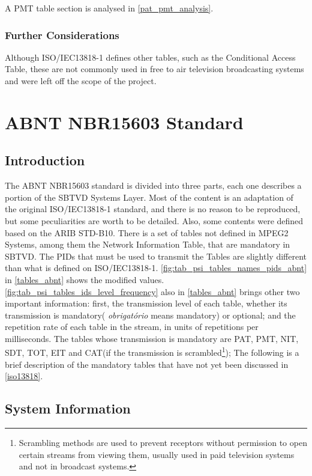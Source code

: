 \documentclass[
	12pt,				%
	openright,			%
	twoside,			%
	a4paper,			%
	brazil,
	french,				%
	english
	]{abntex2}
\begin{document}
A PMT table section is analysed in \autoref{pat_pmt_analysis}.

\subsection{Further Considerations}

Although ISO/IEC13818-1 defines other tables, such as the Conditional Access Table, these are not commonly used in free to air television broadcasting systems and were left off the scope of the project.

\chapter{ABNT NBR15603 Standard}
\label{nbr15603}

\section{Introduction}

The ABNT NBR15603 standard is divided into three parts, each one describes a portion of the SBTVD Systems Layer. Most of the content is an adaptation of the original ISO/IEC13818-1 standard, and there is no reason to be reproduced, but some peculiarities are worth to be detailed. Also, some contents were defined based on the ARIB STD-B10. There is a set of tables not defined in MPEG2 Systems, among them the Network Information Table, that are mandatory in SBTVD. The PIDs that must be used to transmit the Tables are slightly different than what is defined on ISO/IEC13818-1. \autoref{fig:tab_psi_tables_names_pids_abnt} in \autoref{tables_abnt} shows the modified values. \autoref{fig:tab_psi_tables_ids_level_frequency} also in \autoref{tables_abnt} brings other two important information: first, the transmission level of each table, whether its transmission is mandatory( \textit{obrigatório} means mandatory) or optional; and the repetition rate of each table in the stream, in units of repetitions per milliseconds. The tables whose transmission is mandatory are PAT, PMT, NIT, SDT, TOT, EIT and CAT(if the transmission is scrambled\footnote{Scrambling methods are used to prevent receptors without permission to open certain streams from viewing them, usually used in paid television systems and not in broadcast systems.}); The following is a brief description of the mandatory tables that have not yet been discussed in \autoref{iso13818}.

\section{System Information} 
\label{abnt_psi}
\end{document}
